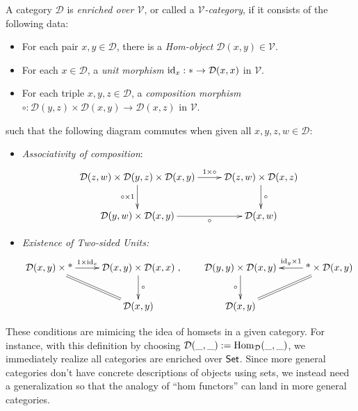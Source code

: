 \documentclass{article}
\begin{document}
\begin{defn}
    A category $\mathcal{D}$ is \emph{enriched over $\mathcal{V}$}, or called a \emph{$\mathcal{V}$-category}, if it consists of the following data:
    \begin{itemize}
        \item For each pair $x,y\in\mathcal{D}$, there is a \emph{Hom-object} $\mathcal{D}(x,y)\in\mathcal{V}$.
        \item For each $x\in\mathcal{D}$, a \emph{unit morphism} $\mathrm{id}_x:*\rightarrow\mathcal{D}(x,x)$ in $\mathcal{V}$.
        \item For each triple $x,y,z\in\mathcal{D}$, a \emph{composition morphism} $\circ:\mathcal{D}(y,z)\times \mathcal{D}(x,y)\rightarrow \mathcal{D}(x,z)$ in $\mathcal{V}$.
    \end{itemize}
    such that the following diagram commutes when given all $x,y,z,w\in\mathcal{D}$:
    \begin{itemize}
        \item \emph{Associativity of composition}:
        \[\xymatrix{
            \mathcal{D}(z,w)\times\mathcal{D}(y,z)\times\mathcal{D}(x,y) \ar[d]_-{\circ\times 1}\ar[r]^-{1\times \circ} & \mathcal{D}(z,w)\times \mathcal{D}(x,z)\ar[d]^-{\circ}\\
            \mathcal{D}(y,w)\times \mathcal{D}(x,y)\ar[r]_-{\circ} & \mathcal{D}(x,w)
        }\]
        \item \emph{Existence of Two-sided Units:}
        \[\xymatrix{
            \mathcal{D}(x,y)\times \text{*} \ar@{=}[dr] \ar[r]^-{1\times \id_x} & \mathcal{D}(x,y)\times \mathcal{D}(x,x) \ar[d]^-{\circ}\\
            & \mathcal{D}(x,y)
        },\quad\quad \xymatrix{
            \mathcal{D}(y,y)\times \mathcal{D}(x,y)\ar[d]_-{\circ} & \text{*} \times \mathcal{D}(x,y) \ar[l]_-{\id_y\times 1} \ar@{=}[dl]\\
            \mathcal{D}(x,y)
        }\]
    \end{itemize}
\end{defn}

These conditions are mimicing the idea of homsets in a given category. For instance, with this definition by choosing $\mathcal{D}(\_,\_):= \mathrm{Hom}_\mathcal{D}(\_,\_)$, we immediately realize all categories are enriched over $\mathsf{Set}$. Since more general categories don't have concrete descriptions of objects using sets, we instead need a generalization so that the analogy of ``hom functors'' can land in more general categories. 
\end{document}
